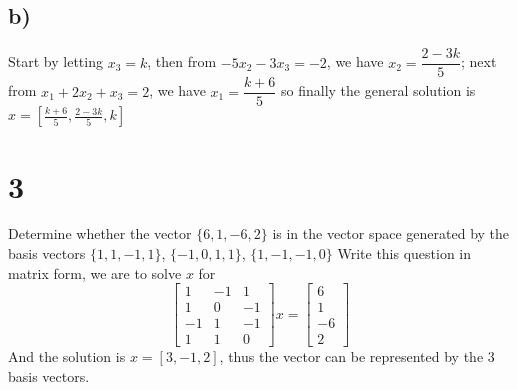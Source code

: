 \documentclass{article}
\begin{document}
\begin{myleftlinebox}
    \subsection*{b)}
    Start by letting \(x_3 = k\), then from \(-5 x_2-3x_3 = -2\), we have \(x_2 = \dfrac{2-3k}{5}\); next from \(x_1 + 2x_2 +x_3 = 2\), we have \(x_1 = \dfrac{k+6}{5}\) so finally the general solution is \(x = [\frac{k+6}{5},\frac{2-3k}{5},k]\)

\end{myleftlinebox} 

\section*{3}
\begin{myleftlinebox}
    Determine whether the vector \(\{6,1,-6,2\}\) is in the vector space generated by the basis vectors \(\{1,1,-1,1\}\), \(\{-1,0,1,1\}\), \(\{1,-1,-1,0\}\)
    \tcblower
    Write this question in matrix form, we are to solve \(x\) for 
    \[\begin{bmatrix}
        1 & -1 & 1\\
        1 & 0 & -1\\
        -1 & 1 & -1\\
        1 & 1 & 0
    \end{bmatrix} x =  \begin{bmatrix}
        6\\ 1 \\ -6 \\ 2
    \end{bmatrix}\]
    And the solution is \(x=[3,-1,2]\), thus the vector can be represented by the 3 basis vectors.
\end{myleftlinebox}
\end{document}
